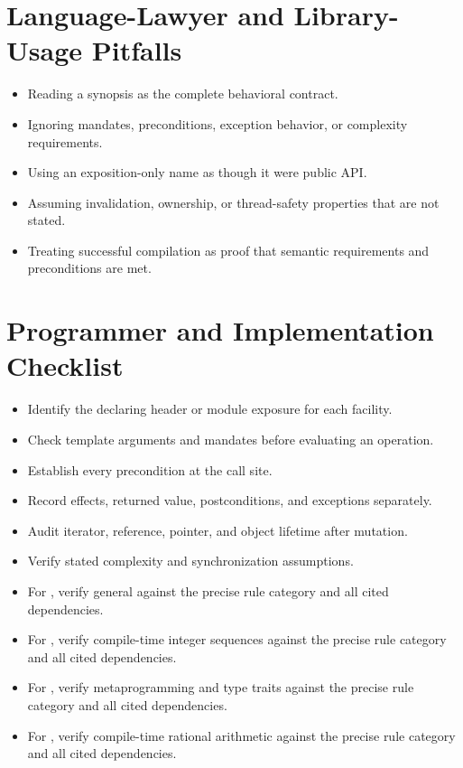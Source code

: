 \documentclass[11pt,letterpaper]{article}
\begin{document}
\section{Language-Lawyer and Library-Usage Pitfalls}
\begin{CornellReferencePitfallBox}\begin{itemize}[label=\textcolor{CornellReferenceAmber}{$\blacktriangleright$}]
\item Reading a synopsis as the complete behavioral contract.
\item Ignoring mandates, preconditions, exception behavior, or complexity requirements.
\item Using an exposition-only name as though it were public API.
\item Assuming invalidation, ownership, or thread-safety properties that are not stated.
\item Treating successful compilation as proof that semantic requirements and preconditions are met.
\end{itemize}\end{CornellReferencePitfallBox}
\section{Programmer and Implementation Checklist}
\begin{CornellReferenceChecklistBox}\begin{itemize}[label=$\square$]
\item Identify the declaring header or module exposure for each facility.
\item Check template arguments and mandates before evaluating an operation.
\item Establish every precondition at the call site.
\item Record effects, returned value, postconditions, and exceptions separately.
\item Audit iterator, reference, pointer, and object lifetime after mutation.
\item Verify stated complexity and synchronization assumptions.
\item For , verify general against the precise rule category and all cited dependencies.
\item For , verify compile-time integer sequences against the precise rule category and all cited dependencies.
\item For , verify metaprogramming and type traits against the precise rule category and all cited dependencies.
\item For , verify compile-time rational arithmetic against the precise rule category and all cited dependencies.
\end{itemize}\end{CornellReferenceChecklistBox}
\end{document}
